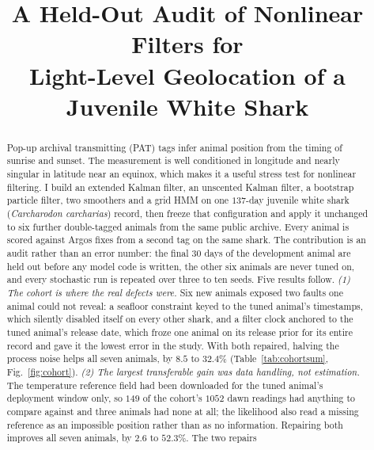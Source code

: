 \documentclass[conference]{IEEEtran}
\begin{document}
\title{A Held-Out Audit of Nonlinear Filters for\\
Light-Level Geolocation of a Juvenile White Shark}

\author{
}

\maketitle

\begin{abstract}
Pop-up archival transmitting (PAT) tags infer animal position from the timing
of sunrise and sunset. The measurement is well conditioned in longitude and
nearly singular in latitude near an equinox, which makes it a useful stress
test for nonlinear filtering. I build an extended Kalman filter, an unscented
Kalman filter, a bootstrap particle filter, two smoothers and a grid HMM on
one $137$-day juvenile white shark (\emph{Carcharodon carcharias}) record,
then freeze that configuration and apply it unchanged to six further
double-tagged animals from the same public archive. Every animal is scored
against Argos fixes from a second tag on the same shark. The contribution is
an audit rather than an error number: the final $30$ days of the development
animal are held out before any model code is written, the other six animals
are never tuned on, and every stochastic run is repeated over three to ten
seeds. Five results follow. \emph{(1) The cohort is where the real defects
were.} Six new animals exposed two faults one animal could not reveal: a
seafloor constraint keyed to the tuned animal's timestamps, which silently
disabled itself on every other shark, and a filter clock anchored to the tuned
animal's release date, which froze one animal on its release prior for its
entire record and gave it the lowest error in the study. With both repaired,
halving the process noise helps all seven animals, by $8.5$ to $32.4\%$
(Table~\ref{tab:cohortsum}, Fig.~\ref{fig:cohort}). \emph{(2) The largest
transferable gain was data handling, not estimation.} The temperature
reference field had been downloaded for the tuned animal's deployment window
only, so $149$ of the cohort's $1052$ dawn readings had anything to compare
against and three animals had none at all; the likelihood also read a missing
reference as an impossible position rather than as no information. Repairing
both improves all seven animals, by $2.6$ to $52.3\%$. The two repairs

\end{abstract}
\end{document}
